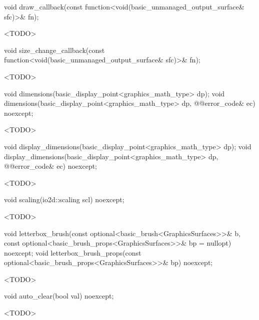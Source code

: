 %
\begin{itemdecl}
void draw_callback(const function<void(basic_unmanaged_output_surface& sfc)>& fn);
\end{itemdecl}
\begin{itemdescr}
\pnum
\effects
<TODO>
\end{itemdescr}

%
\begin{itemdecl}
void size_change_callback(const function<void(basic_unmanaged_output_surface& sfc)>& fn);
\end{itemdecl}
\begin{itemdescr}
\pnum
\effects
<TODO>
\end{itemdescr}

%
\begin{itemdecl}
void dimensions(basic_display_point<graphics_math_type> dp);
void dimensions(basic_display_point<graphics_math_type> dp, @\stdqualifier{}@error_code& ec) noexcept;
\end{itemdecl}
\begin{itemdescr}
\pnum
\effects
<TODO>
\end{itemdescr}

%
\begin{itemdecl}
void display_dimensions(basic_display_point<graphics_math_type> dp);
void display_dimensions(basic_display_point<graphics_math_type> dp, @\stdqualifier{}@error_code& ec) noexcept;
\end{itemdecl}
\begin{itemdescr}
\pnum
\effects
<TODO>
\end{itemdescr}

%
\begin{itemdecl}
void scaling(io2d::scaling scl) noexcept;
\end{itemdecl}
\begin{itemdescr}
\pnum
\effects
<TODO>
\end{itemdescr}

%
\begin{itemdecl}
void letterbox_brush(const optional<basic_brush<GraphicsSurfaces>>& b,
  const optional<basic_brush_props<GraphicsSurfaces>>& bp = nullopt) noexcept;
void letterbox_brush_props(const optional<basic_brush_props<GraphicsSurfaces>>& bp) noexcept;
\end{itemdecl}
\begin{itemdescr}
\pnum
\effects
<TODO>
\end{itemdescr}

%
\begin{itemdecl}
void auto_clear(bool val) noexcept;
\end{itemdecl}
\begin{itemdescr}
\pnum
\effects
<TODO>
\end{itemdescr}
